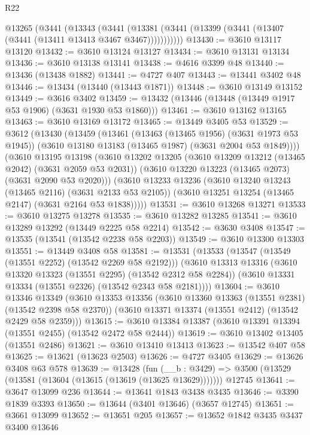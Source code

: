 \begin{lexlean}{R22}
\begin{coremodule}
    @13265
      (@3441
        (@13343
          (@3441 (@13381 (@3441 (@13399 (@3441 (@13407 (@3441 (@13411 @13413 @3467 @3467)))))))))))
@13430 := @3610 @13117 @13120
@13432 := @3610 @13124 @13127
@13434 := @3610 @13131 @13134
@13436 := @3610 @13138 @13141
@13438 := @4616 @3399 @48
@13440 := @13436 (@13438 @1882)
@13441 := @4727 @407
@13443 := @13441 @3402 @48
@13446 := @13434 (@13440 (@13443 @1871))
@13448 := @3610 @13149 @13152
@13449 := @3616 @3402
@13459 := @13432 (@13446 (@13448 (@13449 @1917 @53 @1906) (@3631 @1930 @53 @1860)))
@13461 := @3610 @13162 @13165
@13463 := @3610 @13169 @13172
@13465 := @13449 @3405 @53
@13529 := @3612
    (@13430
      (@13459
        (@13461
          (@13463 (@13465 @1956) (@3631 @1973 @53 @1945))
          (@3610 @13180 @13183 (@13465 @1987) (@3631 @2004 @53 @1849))))
      (@3610
        @13195
        @13198
        (@3610
          @13202
          @13205
          (@3610 @13209 @13212 (@13465 @2042) (@3631 @2059 @53 @2031))
          (@3610 @13220 @13223 (@13465 @2073) (@3631 @2090 @53 @2020)))
        (@3610
          @13233
          @13236
          (@3610 @13240 @13243 (@13465 @2116) (@3631 @2133 @53 @2105))
          (@3610 @13251 @13254 (@13465 @2147) (@3631 @2164 @53 @1838)))))
@13531 := @3610 @13268 @13271
@13533 := @3610 @13275 @13278
@13535 := @3610 @13282 @13285
@13541 := @3610 @13289 @13292 (@13449 @2225 @58 @2214)
@13542 := @3630 @3408
@13547 := @13535 (@13541 (@13542 @2238 @58 @2203))
@13549 := @3610 @13300 @13303
@13551 := @13449 @3408 @58
@13581 := @13531
    (@13533
      (@13547 (@13549 (@13551 @2252) (@13542 @2269 @58 @2192)))
      (@3610
        @13313
        @13316
        (@3610 @13320 @13323 (@13551 @2295) (@13542 @2312 @58 @2284))
        (@3610 @13331 @13334 (@13551 @2326) (@13542 @2343 @58 @2181))))
@13604 := @3610
    @13346
    @13349
    (@3610
      @13353
      @13356
      (@3610 @13360 @13363 (@13551 @2381) (@13542 @2398 @58 @2370))
      (@3610 @13371 @13374 (@13551 @2412) (@13542 @2429 @58 @2359)))
@13615 := @3610 @13384 @13387 (@3610 @13391 @13394 (@13551 @2455) (@13542 @2472 @58 @2444))
@13619 := @3610 @13402 @13405 (@13551 @2486)
@13621 := @3610 @13410 @13413
@13623 := @13542 @407 @58
@13625 := @13621 (@13623 @2503)
@13626 := @4727 @3405
@13629 := @13626 @3408 @63 @578
@13639 := @13428
    (fun (__b : @3429) => @3500 (@13529 (@13581 (@13604 (@13615 (@13619 (@13625 @13629)))))))
    @12745
@13641 := @3647 @13099 @236
@13644 := @13641 @1843 @3438 @3435
@13646 := @3390 @1839 @3393
@13650 := @13644 (@3401 @13646) (@3657 @12745)
@13651 := @3661 @13099
@13652 := @13651 @205
@13657 := @13652 @1842 @3435 @3437 @3400 @13646

\end{coremodule}
\end{lexlean}
